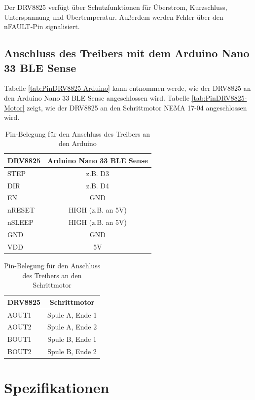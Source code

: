 Der DRV8825 verfügt über Schutzfunktionen für Überstrom, Kurzschluss, Unterspannung und Übertemperatur. Außerdem werden Fehler über den nFAULT-Pin signalisiert. \cite{DRV8825.1}

\subsection{Anschluss des Treibers mit dem Arduino Nano 33 BLE Sense}

Tabelle \autoref{tab:PinDRV8825-Arduino} kann entnommen werde, wie der DRV8825 an den Arduino Nano 33 BLE Sense angeschlossen wird. Tabelle \autoref{tab:PinDRV8825-Motor} zeigt, wie der DRV8825 an den Schrittmotor NEMA 17-04 angeschlossen wird. 

\begin{table}[htpb]
	\centering
	\begin{tabular}{|l|c|}
		\hline
		\textbf{DRV8825} & \textbf{Arduino Nano 33 BLE Sense} \\
		\hline
		STEP & z.B. D3 \\
		DIR & z.B. D4 \\
		EN & GND \\
		nRESET & HIGH (z.B. an 5V) \\
		nSLEEP & HIGH (z.B. an 5V) \\
		GND & GND \\
		VDD & 5V \\
		\hline
	\end{tabular}
	\caption{Pin-Belegung für den Anschluss des Treibers an den Arduino \cite{DRV8825.2}}
	\label{tab:PinDRV8825-Arduino}
\end{table}

\begin{table}[htpb]
	\centering
	\begin{tabular}{|l|c|}
		\hline
		\textbf{DRV8825} & \textbf{Schrittmotor} \\
		\hline
		AOUT1 & Spule A, Ende 1 \\
		AOUT2 & Spule A, Ende 2 \\
		BOUT1 & Spule B, Ende 1 \\
		BOUT2 & Spule B, Ende 2 \\
		\hline
	\end{tabular}
	\caption{Pin-Belegung für den Anschluss des Treibers an den Schrittmotor}
	\label{tab:PinDRV8825-Motor}
\end{table}

\section{Spezifikationen}

